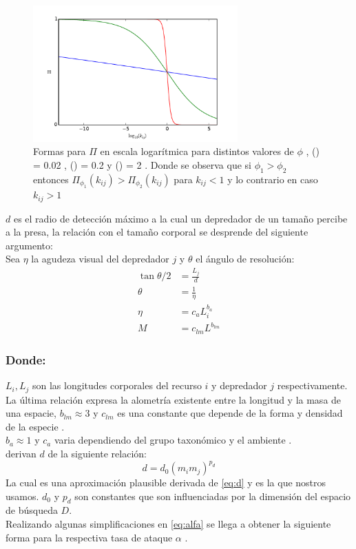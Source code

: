\begin{figure}
\begin{center}
 \includegraphics[width=0.7\textwidth]{./Plots/CaptureEfficiency.pdf}
 \caption[$\Pi$]{ Formas para $\Pi$ en escala logar\'itmica para distintos valores de $\phi$ , ({\hwplotB}) = 0.02 , ({\hwplotG}) = 0.2 y ({\hwplotR}) = 2 . Donde se observa que si $\phi_1 > \phi_2$ entonces $\Pi_{\phi_1}(k_{ij}) >\Pi_{\phi_2}(k_{ij})$ para $k_{ij} < 1$ y lo contrario en caso $k_{ij}>1$ }
 \label{fig:efficiency} 
\end{center}
\end{figure}

$d$ es el radio de detecci\'on m\'aximo a la cual un depredador de un tama\~no percibe a la presa, la relaci\'on con el tama\~no corporal se desprende del siguiente argumento:\\ Sea $\eta$ la agudeza visual del depredador $j$ y $\theta$ el \'angulo de resoluci\'on:
\begin{equation}\label{eq:d}
\begin{aligned}
\tan{\theta/2} &= \frac{L_{j}}{d} \\
\theta &= \frac{1}{\eta} \\
\eta & = c_a L_i^{b_a} \\
M &= c_{lm}L^{b_{lm}} 
\end{aligned}
\end{equation}
\subsubsection*{Donde:}
$L_i , L_j$ son las longitudes corporales del recurso $i$ y depredador $j$ respectivamente. \\La \'ultima relaci\'on expresa la alometr\'ia existente entre la longitud y la masa de una espacie, $b_{lm} \approx 3 $ y $c_{lm}$ es una constante que depende de la forma y densidad de la especie \citep{peters1986ecological,mcgill2006allometric}. \\
$b_a \approx 1 $ y $c_a$ varia dependiendo del grupo taxon\'omico y el ambiente \citep{kiltie2000scaling} .\\
\cite{pawar2012dimensionality} derivan $d$ de la siguiente relaci\'on:
\[ d = d_0(m_im_j)^{p_d} \]
La cual es una aproximaci\'on plausible derivada de \eqref{eq:d} y es la que nostros usamos. $d_0$ y $p_d$ son constantes que son influenciadas por la dimensi\'on del espacio de b\'usqueda $D$. \\
Realizando algunas simplificaciones en \eqref{eq:alfa} se llega a obtener la siguiente forma para la respectiva tasa de ataque $\alpha$ \citep{pawar2012dimensionality}.

